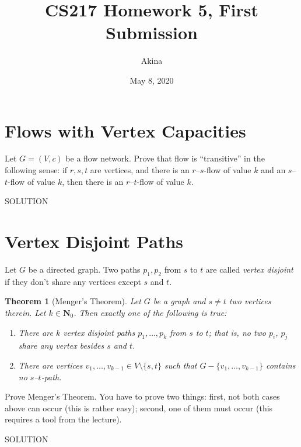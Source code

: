 \documentclass[11pt,a4paper,oneside]{article}
\newtheorem{theorem}{Theorem}
\renewcommand{\hwtitle} {CS217 Homework 5, First Submission}
\renewcommand{\hwauthor}{Akina}
\renewcommand{\hwdate}{May 8, 2020}
\begin{document}
\title{\hwtitle}
\author{\hwauthor}
\date{\hwdate}
\maketitle



\setcounter{section}{4}
\section*{Flows with Vertex Capacities}


\begin{problem}{1}
	\statement
    Let $G = (V,c)$ be a flow network. Prove that flow is ``transitive'' in the following sense: if $r,s,t$ are vertices, 
    and there is an $r$--$s$-flow of value $k$ and an $s$--$t$-flow of value $k$, then there is an $r$--$t$-flow of 
    value $k$.
    
    \solution
    SOLUTION
\end{problem}

\section*{Vertex Disjoint Paths}

Let $G$ be a directed graph. Two paths $p_1, p_2$ from $s$ to $t$ are called {\em vertex disjoint}
if they don't share any vertices except $s$ and $t$. 

\begin{theorem}[Menger's Theorem]
   Let $G$ be a graph and $s \ne t$ two vertices therein. Let $k \in \mathbf{N}_0$. 
   Then exactly one of the following is true:
   \begin{enumerate}
   \item There are $k$ vertex disjoint paths $p_1,\dots,p_k$ from $s$ to $t$; that is, no two $p_i$, $p_j$ share
   any vertex besides $s$ and $t$.
   \item There are vertices $v_1,\dots,v_{k-1} \in V \setminus \{s,t\}$ such that
   $G - \{v_1,\dots, v_{k-1}\}$ contains no $s$--$t$-path.
   \end{enumerate}
\end{theorem}

\begin{problem}{3}
	\statement
   Prove Menger's Theorem. You have to prove two things: first, not both cases above can occur (this is rather easy);
   second, one of them must occur (this requires a tool from the lecture).
   
    \solution
    SOLUTION
\end{problem}
\end{document}
